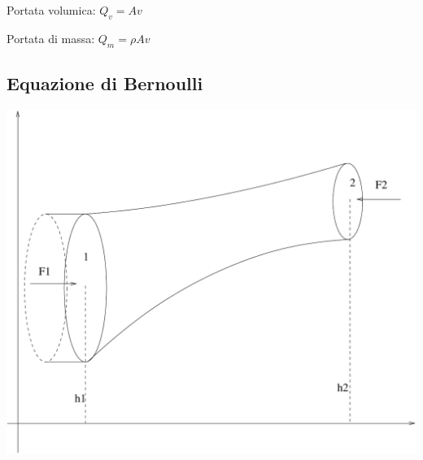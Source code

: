 Portata volumica: $Q_v=Av$

Portata di massa: $Q_m=\rho Av$

\subsection{Equazione di Bernoulli}


\begin{center}
\includegraphics[scale=0.4]{immagini/fisica1/Bernoulli}
\end{center}


